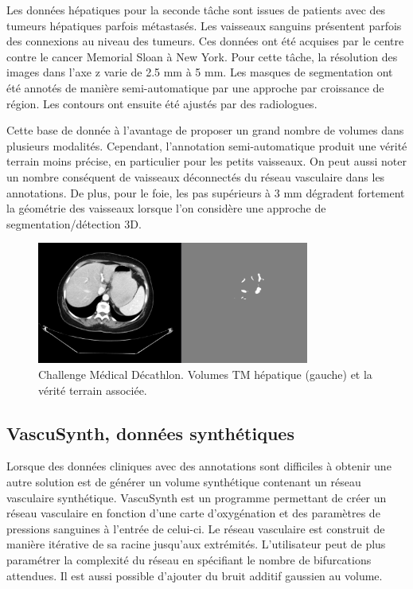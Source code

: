 Les données hépatiques pour la seconde tâche sont issues de patients avec des tumeurs hépatiques parfois métastasés. Les vaisseaux sanguins présentent parfois des connexions au niveau des tumeurs. Ces données ont été acquises par le centre contre le cancer Memorial Sloan à New York. Pour cette tâche, la résolution des images dans l'axe z varie de 2.5 mm à 5 mm. Les masques de segmentation ont été annotés de manière semi-automatique par une approche par croissance de région. Les contours ont ensuite été ajustés par des radiologues.

Cette base de donnée à l'avantage de proposer un grand nombre de volumes dans plusieurs modalités. Cependant, l'annotation semi-automatique produit une vérité terrain moins précise, en particulier pour les petits vaisseaux. On peut aussi noter un nombre conséquent de vaisseaux déconnectés du réseau vasculaire dans les annotations. De plus, pour le foie, les pas supérieurs à 3 mm dégradent fortement la géométrie des vaisseaux lorsque l'on considère une approche de segmentation/détection 3D.

\begin{figure}
    \centering
    \includegraphics[height=4cm]{Images/MD_examples.png}
    \caption{Challenge Médical Décathlon. Volumes TM hépatique (gauche) et la vérité terrain associée.}
    \label{fig:MD_examples}
\end{figure}

\subsection{VascuSynth, données synthétiques}

Lorsque des données cliniques avec des annotations sont difficiles à obtenir une autre solution est de générer un volume synthétique contenant un réseau vasculaire synthétique. VascuSynth est un programme permettant de créer un réseau vasculaire en fonction d'une carte d'oxygénation et des paramètres de pressions sanguines à l'entrée de celui-ci. Le réseau vasculaire est construit de manière itérative de sa racine jusqu'aux extrémités. L'utilisateur peut de plus paramétrer la complexité du réseau en spécifiant le nombre de bifurcations attendues. Il est aussi possible d'ajouter du bruit additif gaussien au volume.

